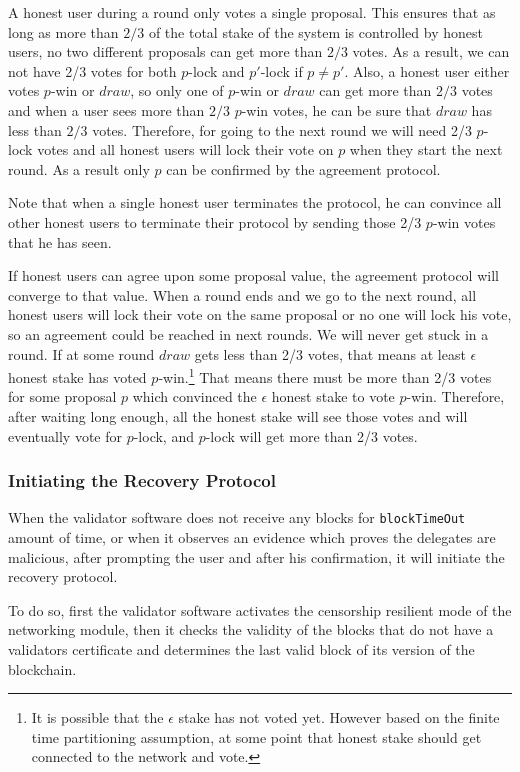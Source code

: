 A honest user during a round only votes a single proposal. This ensures that as long as more than $2/3$ of the total
stake of the system is controlled by honest users, no two different proposals can get more than $2/3$ votes.
As a result, we can not have 2/3 votes for both $p$-lock and $p'$-lock if $p \neq p'$. Also, a honest user
either votes $p$-win or $draw$, so only one of $p$-win or $draw$ can get more than $2/3$ votes and when a
user sees more than $2/3$ $p$-win votes, he can be sure that $draw$ has less than $2/3$ votes. Therefore, for going
to the next round we will need 2/3 $p$-lock
votes and all honest users will lock their vote on $p$ when they start the next round. As a result only $p$ can be
confirmed by the agreement protocol.

Note that when a single honest user terminates the protocol, he can convince all other honest users to terminate
their protocol by sending those 2/3 $p$-win votes that he has seen.

If honest users can agree upon some proposal value, the agreement protocol will converge to that value. When a round
ends and we go to the next round, all honest users will lock their vote on
the same proposal or no one will lock his vote, so an agreement could be reached in next rounds. We will never get
stuck in a round. If at some
round $draw$ gets less than 2/3 votes, that means at least $\epsilon$ honest stake has voted
$p$-win.\footnote{It is possible that the $\epsilon$ stake has not voted yet. However based on the finite time
partitioning assumption, at some point that honest stake should get connected to the network and vote.}
That means there must be more than 2/3 votes for some proposal $p$ which convinced the $\epsilon$ honest stake to
vote $p$-win. Therefore, after waiting long enough, all the honest stake will see those votes and will eventually
vote for $p$-lock, and $p$-lock will get more than 2/3 votes.

\subsubsection{Initiating the Recovery Protocol}

When the validator software does not receive any blocks for \texttt{blockTimeOut} amount of time, or when it observes an
evidence which proves the delegates are malicious, after prompting the user and after his confirmation, it will
initiate the recovery protocol.

To do so, first the validator software activates the censorship resilient mode of the networking module, then it checks
the validity of the blocks that do not have a validators certificate and determines the last valid block of its
version of the blockchain.

